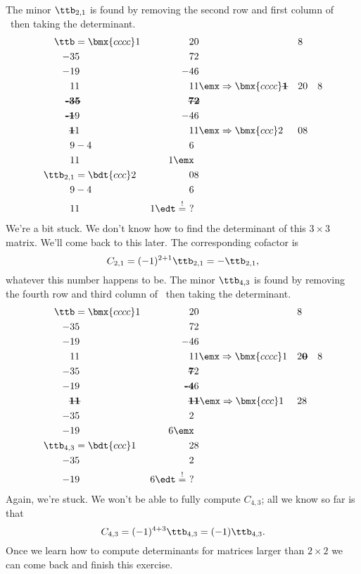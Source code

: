{The minor $\ttb_{2,1}$ is found by removing the second row and first column of \ttb\ then taking the determinant.
\begin{align*}
\ttb &= \bmx{cccc}1&2&0&8\\-3&5&7&2\\-1&9&-4&6\\1&1&1&1\emx \Rightarrow \bmx{cccc}\textbf{\sout{1}}&2&0&8\\ \textbf{\sout{-3}}&\textbf{\sout{5}}&\textbf{\sout{7}}&\textbf{\sout{2}}\\ \textbf{\sout{-1}}&9&-4&6\\ \textbf{\sout{1}}&1&1&1\emx \Rightarrow \bmx{ccc}2&0&8\\9&-4&6\\1&1&1\emx\\
\ttb_{2,1} &= \bdt{ccc}2&0&8\\9&-4&6\\1&1&1\edt \stackrel{!}{=} \ ?
\end{align*}
We're a bit stuck. We don't know how to find the determinant of this $3\times 3$ matrix. We'll come back to this later. The corresponding cofactor is
\[
C_{2,1} = (-1)^{2+1}\ttb_{2,1} = -\ttb_{2,1},
\]
whatever this number happens to be. The minor $\ttb_{4,3}$ is found by removing the fourth row and third column of \ttb\ then taking the determinant.
\begin{align*}
\ttb &= \bmx{cccc}1&2&0&8\\-3&5&7&2\\-1&9&-4&6\\1&1&1&1\emx \Rightarrow \bmx{cccc}1&2&\textbf{\sout{0}}&8\\-3&5&\textbf{\sout{7}}&2\\-1&9&\textbf{\sout{-4}}&6\\ \textbf{\sout{1}}&\textbf{\sout{1}}&\textbf{\sout{1}}&\textbf{\sout{1}}\emx \Rightarrow \bmx{ccc}1&2&8\\-3&5&2\\-1&9&6\emx\\
\ttb_{4,3} &= \bdt{ccc}1&2&8\\-3&5&2\\-1&9&6\edt \stackrel{!}{=}\ ?
\end{align*}
Again, we're stuck. We won't be able to fully compute $C_{4,3}$; all we know so far is that
\[
C_{4,3} = (-1)^{4+3}\ttb_{4,3} = (-1)\ttb_{4,3}.
\]
Once we learn how to compute determinants for matrices larger than $2\times 2$ we can come back and finish this exercise.}

\medskip

